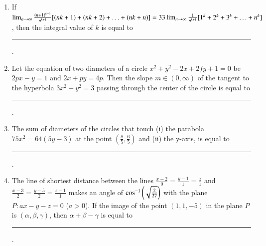 \documentclass[journal,12pt,onecolumn]{IEEEtran}
\theoremstyle{remark}
\begin{document}
\begin{enumerate}
    \item If $\lim_{n \to \infty}\frac{\left(n+1\right)^{k-1}}{n^{k+1}}[\left(nk+1\right) + \left(nk+2\right) + \ldots + \left(nk+n\right)] = 33\lim_{n\to \infty}\frac{1}{n^{k+1}}[1^k+2^k+3^k+\ldots+n^k]$, then the integral value of $k$ is equal to \rule{2.5cm}{0.4pt}.
    
    \item Let the equation of two diameters of a circle $x^2 + y^2 - 2x + 2fy + 1 = 0$ be $2px - y = 1$ and $2x + py = 4p$. Then the slope $m \in (0, \infty)$ of the tangent to the hyperbola $3x^2 - y^2 = 3$ passing through the center of the circle is equal to \rule{2.5cm}{0.4pt}.
    
    \item The sum of diameters of the circles that touch (i) the parabola $75x^2 = 64(5y - 3)$ at the point $\left(\frac{8}{5}, \frac{6}{5}\right)$ and (ii) the y-axis, is equal to \rule{2.5cm}{0.4pt}.
    
    \item The line of shortest distance between the lines $\frac{x-2}{0} = \frac{y-1}{1} = \frac{z}{1}$ and $\frac{x-3}{2} = \frac{y-5}{2} = \frac{z-1}{1}$ makes an angle of $\cos^{-1}\left(\sqrt{\frac{2}{27}}\right)$ with the plane $P: ax - y - z = 0$ ($a > 0$). If the image of the point $(1, 1, -5)$ in the plane $P$ is $(\alpha, \beta, \gamma)$, then $\alpha + \beta - \gamma$ is equal to \rule{2.5cm}{0.4pt}.
\end{enumerate}
\end{document}
